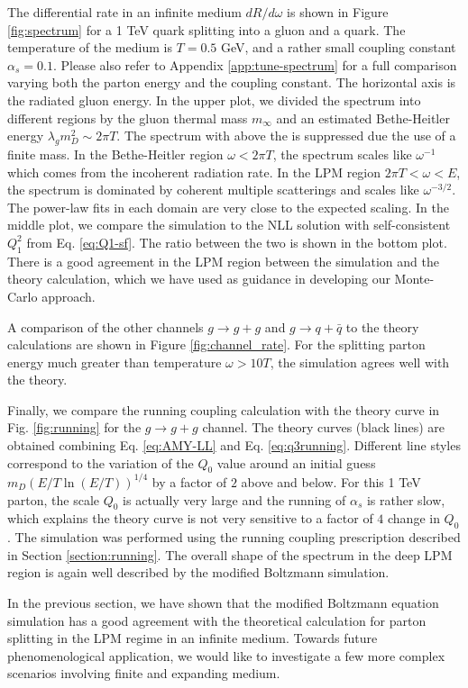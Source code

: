 The differential rate in an infinite medium $dR/d\omega$ is shown in Figure \ref{fig:spectrum} for a 1 TeV quark splitting into a gluon and a quark.
The temperature of the medium is $T=0.5$ GeV, and a rather small coupling constant $\alpha_s = 0.1$.
Please also refer to Appendix \ref{app:tune-spectrum} for a full comparison varying both the parton energy and the coupling constant.
The horizontal axis is the radiated gluon energy.
In the upper plot, we divided the spectrum into different regions by the gluon thermal mass $m_\infty$ and an estimated Bethe-Heitler energy $\lambda_g m_D^2 \sim 2\pi T$.
The spectrum with above the is suppressed due the use of a finite mass.
In the Bethe-Heitler region $\omega < 2\pi T$, the spectrum scales like $\omega^{-1}$ which comes from the incoherent radiation rate.
In the LPM region $2\pi T < \omega < E$, the spectrum is dominated by coherent multiple scatterings and scales like $\omega^{-3/2}$.
The power-law fits in each domain are very close to the expected scaling.
In the middle plot, we compare the simulation to the NLL solution with self-consistent $Q_1^2$ from Eq. \ref{eq:Q1-sf}. 
The ratio between the two is shown in the bottom plot.
There is a good agreement in the LPM region between the simulation and the theory calculation, which we have used as guidance in developing our Monte-Carlo approach.

A comparison of the other channels $g\rightarrow g+g$ and $g\rightarrow q+\bar{q}$ to the theory calculations are shown in Figure \ref{fig:channel_rate}.
For the splitting parton energy much greater than temperature $\omega > 10 T$, the simulation agrees well with the theory. 

Finally, we compare the running coupling calculation with the theory curve in Fig. \ref{fig:running} for the $g\rightarrow g+g$ channel.
The theory curves (black lines) are obtained combining Eq. \ref{eq:AMY-LL} and Eq. \ref{eq:q3running}.
Different line styles correspond to the variation of the $Q_0$ value around an initial guess $m_D (E/T \ln(E/T) )^{1/4}$ by a factor of $2$ above and below.
For this 1 TeV parton, the scale $Q_0$ is actually very large and the running of $\alpha_s$ is rather slow, which explains the theory curve is not very sensitive to a factor of $4$ change in $Q_0$.
The simulation was performed using the running coupling prescription described in Section \ref{section:running}.
The overall shape of the spectrum in the deep LPM region is again well described by the modified Boltzmann simulation. 


In the previous section, we have shown that the modified Boltzmann equation simulation has a good agreement with the theoretical calculation for parton splitting in the LPM regime in an infinite medium.
Towards future phenomenological application, we would like to investigate a few more complex scenarios involving finite and expanding medium.

